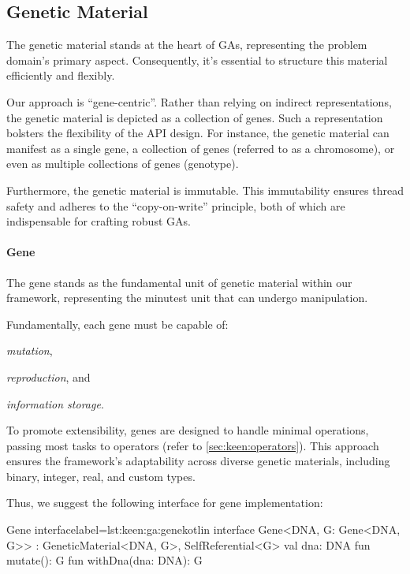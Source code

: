 \subsection{Genetic Material}
\label{sec:keen:ga:material}
  The genetic material stands at the heart of GAs, representing the problem 
  domain's primary aspect.
  Consequently, it's essential to structure this material efficiently and 
  flexibly.

  Our approach is \enquote{gene-centric}.
  Rather than relying on indirect representations, the genetic material is 
  depicted as a collection of genes.
  Such a representation bolsters the flexibility of the API design.
  For instance, the genetic material can manifest as a single gene, a 
  collection of genes (referred to as a chromosome), or even as multiple 
  collections of genes (genotype).

  Furthermore, the genetic material is immutable.
  This immutability ensures thread safety and adheres to the 
  \enquote{copy-on-write} principle, both of which are indispensable for 
  crafting robust GAs.

  \paragraph{Gene}
    The gene stands as the fundamental unit of genetic material within our 
    framework, representing the minutest unit that can undergo manipulation.

    Fundamentally, each gene must be capable of:
    \begin{enumerate*}
      \item \textit{mutation},
      \item \textit{reproduction}, and
      \item \textit{information storage}.
    \end{enumerate*}
    To promote extensibility, genes are designed to handle minimal 
    operations, passing most tasks to operators 
    (refer to \vref{sec:keen:operators}).
    This approach ensures the framework's adaptability across diverse 
    genetic materials, including binary, integer, real, and custom types.

    Thus, we suggest the following interface for gene implementation:

    \begin{code}{Gene interface}{label={lst:keen:ga:gene}}{kotlin}
      interface Gene<DNA, G: Gene<DNA, G>> : GeneticMaterial<DNA, G>,
                                              SelfReferential<G> {
          val dna: DNA
          fun mutate(): G
          fun withDna(dna: DNA): G
      }
    \end{code}

